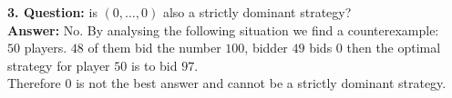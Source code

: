 \begin{example}
	\textbf{3. Question:} is $(0, \dotsc, 0)$ also a strictly dominant strategy? \\
	\textbf{Answer:} No. By analysing the following situation we find a counterexample: \\
	$50$ players. $48$ of them bid the number $100$, bidder $49$ bids $0$ then the optimal strategy for player $50$ is to bid $97$. \\
	Therefore $0$ is not the best answer and cannot be a strictly dominant strategy.
\end{example}


\newpage
